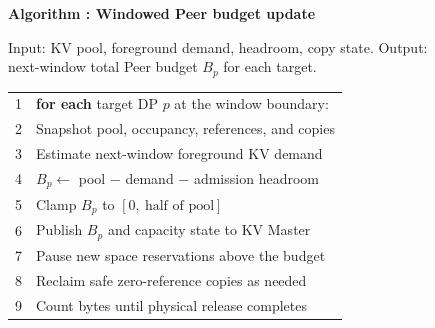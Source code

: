 \begin{figure}[t]
  \raggedright
  \label{alg:adapter}
  \noindent\textbf{Algorithm \thedesignalgorithm: Windowed Peer budget update}
  \par\smallskip
  \noindent Input: KV pool, foreground demand, headroom, copy state.
  Output: next-window total Peer budget $B_p$ for each target.
  \par\smallskip
  \begin{tabularx}{\columnwidth}{@{}r@{\quad}X@{}}
    \toprule
    1 & \textbf{for each} target DP $p$ at the window boundary: \\
    2 & \quad Snapshot pool, occupancy, references, and copies \\
    3 & \quad Estimate next-window foreground KV demand \\
    4 & \quad$B_p\gets$ pool $-$ demand $-$ admission headroom \\
    5 & \quad Clamp $B_p$ to $[0,\ \text{half of pool}]$ \\
    6 & \quad Publish $B_p$ and capacity state to KV Master \\
    7 & \quad Pause new space reservations above the budget \\
    8 & \quad Reclaim safe zero-reference copies as needed \\
    9 & \quad Count bytes until physical release completes \\
    \bottomrule
  \end{tabularx}
\end{figure}


